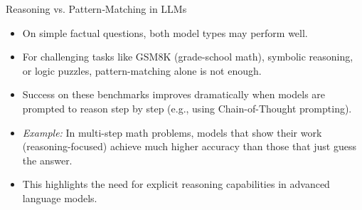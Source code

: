 \begin{frame}[allowframebreaks]{Reasoning vs. Pattern‑Matching in LLMs}
\begin{itemize}
        \begin{itemize}
            \item On simple factual questions, both model types may perform well.
            \item For challenging tasks like GSM8K (grade-school math), symbolic reasoning, or logic puzzles, pattern-matching alone is not enough.
            \item Success on these benchmarks improves dramatically when models are prompted to reason step by step (e.g., using Chain-of-Thought prompting).
            \item \textit{Example:} In multi-step math problems, models that show their work (reasoning-focused) achieve much higher accuracy than those that just guess the answer.
            \item This highlights the need for explicit reasoning capabilities in advanced language models.
        \end{itemize}
    \end{itemize}
\end{frame}
